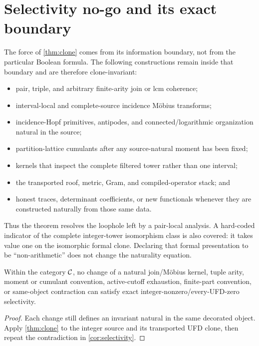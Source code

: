 \section{Selectivity no-go and its exact boundary}
\label{sec:boundary}

The force of \cref{thm:clone} comes from its information boundary, not from
the particular Boolean formula.  The following constructions remain inside
that boundary and are therefore clone-invariant:

\begin{itemize}
\item pair, triple, and arbitrary finite-arity join or lcm coherence;
\item interval-local and complete-source incidence M{\"o}bius transforms;
\item incidence-Hopf primitives, antipodes, and connected/logarithmic
  organization natural in the source;
\item partition-lattice cumulants after any source-natural moment has been
  fixed;
\item kernels that inspect the complete filtered tower rather than one
  interval;
\item the transported roof, metric, Gram, and compiled-operator stack; and
\item honest traces, determinant coefficients, or new functionals whenever
  they are constructed naturally from those same data.
\end{itemize}

Thus the theorem resolves the loophole left by a pair-local analysis.  A
hard-coded indicator of the complete integer-tower isomorphism class is also
covered: it takes value one on the isomorphic formal clone.  Declaring that
formal presentation to be “non-arithmetic” does not change the naturality
equation.

\begin{theorem}
\label{thm:formula-closure}
Within the category \(\mathcal C\), no change of a natural join/M{\"o}bius kernel,
tuple arity, moment or cumulant convention, active-cutoff exhaustion,
finite-part convention, or same-object contraction can satisfy exact
integer-nonzero/every-UFD-zero selectivity.
\end{theorem}
\begin{proof}
Each change still defines an invariant natural in the same decorated object.
Apply \cref{thm:clone} to the integer source and its transported UFD clone,
then repeat the contradiction in \cref{cor:selectivity}.
\end{proof}

